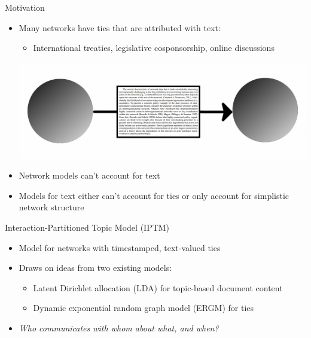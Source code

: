 \documentclass[10pt, xcolor=table]{beamer}
\def\bni{\begin{itemize}} \def\ei{\end{itemize}}
\theoremstyle{definition}
\theoremstyle{remark}
\begin{document}
\begin{frame}{Motivation}
\large
\begin{itemize}
\item Many networks have ties that are attributed with text:
  \vspace{0.1cm}
\begin{itemize}
\item International treaties, legislative cosponsorship, online discussions
\end{itemize}

\begin{center}
\includegraphics[scale=.15]{figures/tieWords}
\end{center} \vspace{-.1cm}
\item Network models can't account for text
\vspace{.3cm}
\item Models for text either can't account for ties or only account
  for simplistic network structure
\end{itemize}
\end{frame}

\begin{frame}{Interaction-Partitioned Topic Model (IPTM)}
\large
	\bni
	\item Model for networks with timestamped, text-valued ties
	\vspace{0.2cm}
	\item Draws on ideas from two existing models:
          \vspace{0.1cm}
	\begin{itemize}
	 \item Latent Dirichlet allocation (LDA) for topic-based
           document content
	  \item Dynamic exponential random graph model (ERGM) for ties
	  \end{itemize}
        \vspace{0.4cm}
\item \textit{Who communicates with whom about what, and when?}
  \ei
\end{frame}
\end{document}
